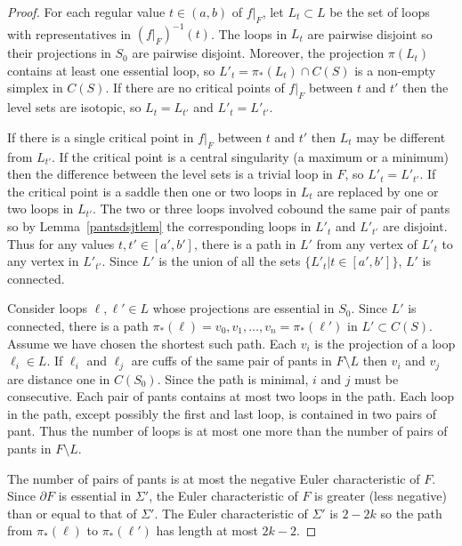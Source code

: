 \documentclass[12pt]{amsart}
\theoremstyle{plain}
\theoremstyle{definition}
\begin{document}
\begin{proof}
For each regular value $t \in (a,b)$ of $f|_F$, let $L_t \subset L$ be the set of loops with representatives in $(f|_F)^{-1}(t)$.  The loops in $L_t$ are pairwise disjoint so their projections in $S_0$ are pairwise disjoint.  Moreover, the projection $\pi(L_t)$ contains at least one essential loop, so $L'_t = \pi_*(L_t) \cap C(S)$ is a non-empty simplex in $C(S)$.  If there are no critical points of $f|_F$ between $t$ and $t'$ then the level sets are isotopic, so $L_t = L_{t'}$ and $L'_t = L'_{t'}$.

If there is a single critical point in $f|_F$ between $t$ and $t'$ then $L_t$ may be different from $L_{t'}$.  If the critical point is a central singularity (a maximum or a minimum) then the difference between the level sets is a trivial loop in $F$, so $L'_t = L'_{t'}$.  If the critical point is a saddle then one or two loops in $L_t$ are replaced by one or two loops in $L_{t'}$.  The two or three loops involved cobound the same pair of pants so by Lemma~\ref{pantsdsjtlem} the corresponding loops in $L'_t$ and $L'_{t'}$ are disjoint.  Thus for any values $t, t' \in [a',b']$, there is a path in $L'$ from any vertex of $L'_t$ to any vertex in $L'_{t'}$.  Since $L'$ is the union of all the sets $\{L'_t | t \in [a',b']\}$, $L'$ is connected.

Consider loops $\ell, \ell' \in L$ whose projections are essential in $S_0$.  Since $L'$ is connected, there is a path $\pi_*(\ell) = v_0, v_1,\dots,v_n = \pi_*(\ell')$ in $L' \subset C(S)$.  Assume we have chosen the shortest such path.  Each $v_i$ is the projection of a loop $\ell_i \in L$.  If $\ell_i$ and $\ell_j$ are cuffs of the same pair of pants in $F \setminus L$ then $v_i$ and $v_j$ are distance one in $C(S_0)$.  Since the path is minimal, $i$ and $j$ must be consecutive.  Each pair of pants contains at most two loops in the path.  Each loop in the path, except possibly the first and last loop, is contained in two pairs of pant.  Thus the number of loops is at most one more than the number of pairs of pants in $F \setminus L$.

The number of pairs of pants is at most the negative Euler characteristic of $F$.  Since $\partial F$ is essential in $\Sigma'$, the Euler characteristic of $F$ is greater (less negative) than or equal to that of $\Sigma'$.  The Euler characteristic of $\Sigma'$ is $2 - 2k$ so the path from $\pi_*(\ell)$ to $\pi_*(\ell')$ has length at most $2k - 2$.
\end{proof}
\end{document}
